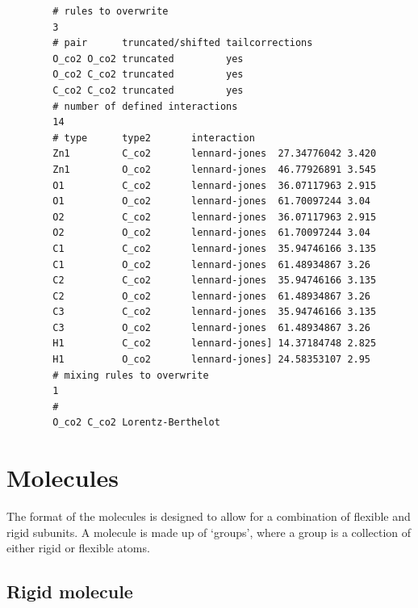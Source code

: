 \begin{verbatim}
        # rules to overwrite
        3
        # pair      truncated/shifted tailcorrections
        O_co2 O_co2 truncated         yes
        O_co2 C_co2 truncated         yes
        C_co2 C_co2 truncated         yes
        # number of defined interactions
        14
        # type      type2       interaction    
        Zn1         C_co2       lennard-jones  27.34776042 3.420
        Zn1         O_co2       lennard-jones  46.77926891 3.545
        O1          C_co2       lennard-jones  36.07117963 2.915
        O1          O_co2       lennard-jones  61.70097244 3.04
        O2          C_co2       lennard-jones  36.07117963 2.915
        O2          O_co2       lennard-jones  61.70097244 3.04
        C1          C_co2       lennard-jones  35.94746166 3.135
        C1          O_co2       lennard-jones  61.48934867 3.26
        C2          C_co2       lennard-jones  35.94746166 3.135
        C2          O_co2       lennard-jones  61.48934867 3.26
        C3          C_co2       lennard-jones  35.94746166 3.135
        C3          O_co2       lennard-jones  61.48934867 3.26
        H1          C_co2       lennard-jones] 14.37184748 2.825
        H1          O_co2       lennard-jones] 24.58353107 2.95
        # mixing rules to overwrite
        1
        #
        O_co2 C_co2 Lorentz-Berthelot
\end{verbatim}

\begin{center}
\end{center}

\section{Molecules}

The format of the molecules is designed to allow for a combination of flexible and rigid subunits. 
A molecule is made up of `groups', where a group
is a collection of either rigid or flexible atoms.

\subsection{Rigid molecule}

